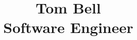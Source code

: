 \documentclass{article}
\begin{document}
\title{Tom Bell \\
  \large Software Engineer}
\author{}
\date{}

\maketitle
\end{document}
